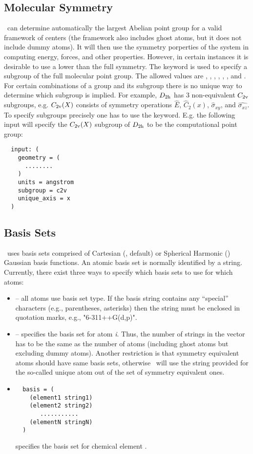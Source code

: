 \subsection{Molecular Symmetry}
\PSIthree\ can determine automatically the largest Abelian point group
for a valid framework of centers (the framework also includes ghost
atoms, but it does not include dummy atoms).
It will then use the symmetry porperties of the system in computing energy,
forces, and other properties.
However, in certain instances it is desirable to use a lower than the
full symmetry. The keyword  is used to specify a subgroup of
the full molecular point group. The allowed values are ,
, , , , ,
and . For certain combinations of a group and
its subgroup there is no unique way to determine which subgroup is
implied. For example, $D_{\rm 2h}$ has 3 non-equivalent $C_{\rm 2v}$ subgroups,
e.g. $C_{\rm 2v}(X)$ consists of symmetry operations $\hat{E}$, $\hat{C}_2(x)$,
$\hat{\sigma}_{xy}$, and $\hat{\sigma_{xz}}$. 
To specify subgroups precisely one has to use the 
keyword. E.g. the following input will specify the $C_{\rm 2v}(X)$
subgroup of $D_{\rm 2h}$ to be the computational point group:
\begin{verbatim}
  input: (
    geometry = (
      ........
    )
    units = angstrom
    subgroup = c2v
    unique_axis = x
  )
\end{verbatim}

\subsection{Basis Sets}
\PSIthree\ uses basis sets comprised of Cartesian (, 
default) or Spherical Harmonic () Gaussian
basis functions.  An atomic basis set is normally identified by a
string. Currently, there exist three ways to specify which basis sets
to use for which atoms:
\begin{itemize}
\item {} -- all atoms use basis set type.  If the
basis string contains any ``special'' characters (e.g., parentheses, 
asterisks) then the string must be enclosed in quotation marks, e.g.,
"6-311++G(d,p)".
\item {} -- 
specifies the basis set for atom {\em i}. Thus, the number of strings
in the  vector has to be the same as the number of
atoms (including ghost atoms but excluding dummy atoms). Another
restriction is that symmetry equivalent atoms should have same basis
sets, otherwise \PSIinput\ will use the string provided for the
so-called unique atom out of the set of symmetry equivalent ones.
\item 
\begin{verbatim}
  basis = (
    (element1 string1)
    (element2 string2)
       ...........
    (elementN stringN)
  )
\end{verbatim}
 specifies the basis set for chemical element 
.
\end{itemize}

